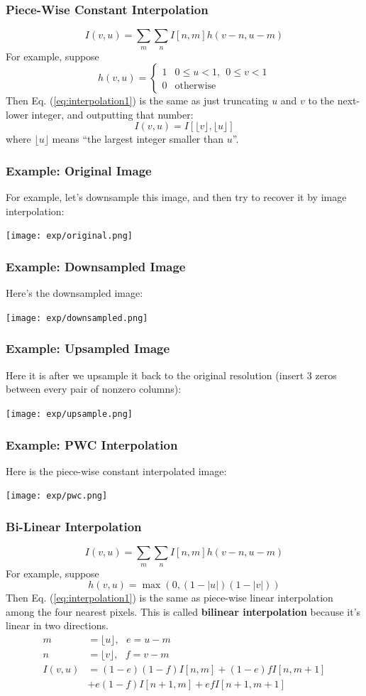 \documentclass{beamer}
\begin{document}
\begin{frame}
  \frametitle{Piece-Wise Constant Interpolation}
  \begin{equation}
  I(v,u) = \sum_m\sum_n I[n,m] h(v-n,u-m)
  \label{eq:interpolation1}
  \end{equation}
  For example, suppose
  \[
  h(v,u) = \left\{\begin{array}{ll}
  1 & 0\le u<1,~~0\le v<1\\
  0 & \mbox{otherwise}
  \end{array}\right.
  \]
  Then Eq. (\ref{eq:interpolation1}) is the same as just truncating $u$
  and $v$ to the next-lower integer, and outputting that number:
  \[
  I(v,u) = I\left[\lfloor v\rfloor,\lfloor u\rfloor\right]
  \]
  where $\lfloor u\rfloor$ means ``the largest integer smaller than $u$''.
\end{frame}

\begin{frame}
  \frametitle{Example: Original Image}
  For example, let's downsample this image, and then try to recover it by image interpolation:
  \centerline{\texttt{[image: exp/original.png]}}
\end{frame}

\begin{frame}
  \frametitle{Example: Downsampled Image}
  Here's the downsampled image:
  \centerline{\texttt{[image: exp/downsampled.png]}}
\end{frame}

\begin{frame}
  \frametitle{Example: Upsampled Image} Here it is after we upsample
  it back to the original resolution (insert 3 zeros between every
  pair of nonzero columns):
  \centerline{\texttt{[image: exp/upsample.png]}}
\end{frame}

\begin{frame}
  \frametitle{Example: PWC Interpolation}

  Here is the piece-wise constant interpolated image:
  \centerline{\texttt{[image: exp/pwc.png]}}
\end{frame}

\begin{frame}
  \frametitle{Bi-Linear Interpolation}
  \[
  I(v,u) = \sum_m\sum_n I[n,m] h(v-n,u-m)
  \]
  For example, suppose
  \[
  h(v,u) = \max\left(0,(1-|u|)(1-|v|)\right)
  \]
  Then Eq. (\ref{eq:interpolation1}) is the same as piece-wise linear
  interpolation among the four nearest pixels.  This is called {\bf
    bilinear interpolation} because it's linear in two directions.
  \begin{align*}
    m &= \lfloor u\rfloor,~~~e=u-m\\
    n &= \lfloor v\rfloor,~~~f=v-m\\
    I(v,u) &= (1-e)(1-f)I[n,m]+(1-e)fI[n,m+1]\\
    &+e(1-f)I[n+1,m]+efI[n+1,m+1]
  \end{align*}
\end{frame}
\end{document}
